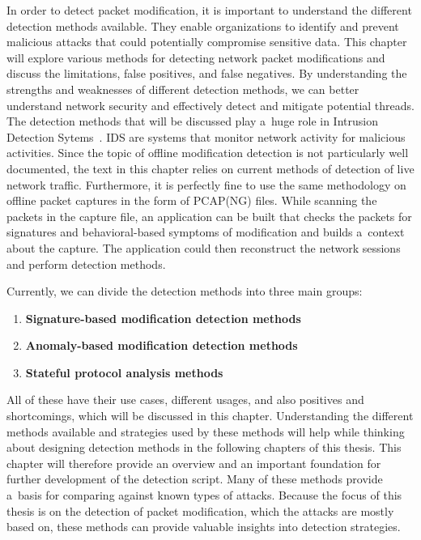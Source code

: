 \documentclass[
  printed,     %
  color,       %
  oneside,     %
  nosansbold,  %
  nocolorbold, %
  nolof,         %
  nolot,         %
]{fithesis4}
\begin{document}
In order to detect packet modification, it is important to understand the different detection methods available. They enable organizations to identify and prevent malicious attacks that could potentially compromise sensitive data. This chapter will explore various methods for detecting network packet modifications and discuss the limitations, false positives, and false negatives. By understanding the strengths and weaknesses of different detection methods, we can better understand network security and effectively detect and mitigate potential threads. The detection methods that will be discussed play a~huge role in Intrusion Detection Sytems~\cite{gtidaps}. IDS are systems that monitor network activity for malicious activities. Since the topic of offline modification detection is not particularly well documented, the text in this chapter relies on current methods of detection of live network traffic. Furthermore, it is perfectly fine to use the same methodology on offline packet captures in the form of PCAP(NG) files. While scanning the packets in the capture file, an application can be built that checks the packets for signatures and behavioral-based symptoms of modification and builds a~context about the capture. The application could then reconstruct the network sessions and perform detection methods.

Currently, we can divide the detection methods into three main groups:

\begin{enumerate}
    \item \textbf{Signature-based modification detection methods}
    \item \textbf{Anomaly-based modification detection methods}
    \item \textbf{Stateful protocol analysis methods}
\end{enumerate}

All of these have their use cases, different usages, and also positives and shortcomings, which will be discussed in this chapter. Understanding the different methods available and strategies used by these methods will help while thinking about designing detection methods in the following chapters of this thesis. This chapter will therefore provide an overview and an important foundation for further development of the detection script. Many of these methods provide a~basis for comparing against known types of attacks. Because the focus of this thesis is on the detection of packet modification, which the attacks are mostly based on, these methods can provide valuable insights into detection strategies.
\end{document}
